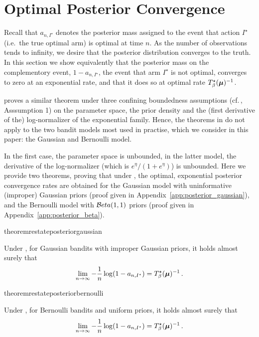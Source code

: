 \section{Optimal Posterior Convergence
}\label{sec:bayesian}

Recall that $a_{n, I^\star}$ denotes the posterior mass assigned to the event that action $I^\star$ (i.e.\ the true optimal arm) is optimal at time $n$. As the number of observations tends to infinity, we desire that the posterior distribution converges to the truth. In this section we show equivalently that the posterior mass on the complementory event, $1 - a_{n, I^\star}$, the event that arm $I^\star$ is not optimal, converges to zero at an exponential rate, and that it does so at optimal rate $T_{\beta}^\star({\boldsymbol \mu})^{-1}$. 

\citet{russo2016ttts} proves a similar theorem under three confining boundedness assumptions (cf.\,\citealt{russo2016ttts}, Asssumption 1) on the parameter space, the prior density and the (first derivative of the) log-normalizer of the exponential family. Hence, the theorems in \cite{russo2016ttts} do not apply to the two bandit models most used in practise, which we consider in this paper: the Gaussian and Bernoulli model. 

In the first case, the parameter space is unbounded, in the latter model, the derivative of the log-normalizer (which is $e^{\eta} / (1 + e^\eta)$) is unbounded. Here we provide two theorems, proving that under \TTTS, the optimal, exponential posterior convergence rates are obtained for the Gaussian model with uninformative (improper) Gaussian priors (proof given in Appendix~\ref{app:posterior_gaussian}), and the Bernoulli model with $\mathcal{B} eta(1,1)$ priors (proof given in Appendix~\ref{app:posterior_beta}).

\begin{restatable}{theorem}{restateposteriorgaussian}\label{thm:posterior_gaussian}
\begin{leftbar}[theorembar]
    Under \TTTS, for Gaussian bandits with improper Gaussian priors, it holds almost surely that 
    \[
        \lim_{n\rightarrow{\infty}} -\frac{1}{n}\log(1-a_{n,I^\star}) = T_{\beta}^\star({\boldsymbol \mu})^{-1}\,.
    \]
\end{leftbar}
\end{restatable}

\begin{restatable}{theorem}{restateposteriorbernoulli}\label{thm:posterior_bernoulli}
\begin{leftbar}[theorembar]
	Under \TTTS, for Bernoulli bandits and uniform priors, it holds almost surely that
	\[
	\lim_{n\rightarrow{\infty}} -\frac{1}{n}\log(1-a_{n,I^\star}) = T_{\beta}^\star({\boldsymbol \mu})^{-1}\,.
	\]
\end{leftbar}
\end{restatable}
